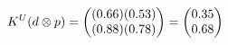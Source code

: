 \documentclass[preview]{standalone}
\begin{document}
\begin{align*}
\special{dvisvgm:raw <g id='unique000'>}K^U(d \otimes p) = \begin{pmatrix} (0.66)(0.53) \\ (0.88)(0.78) \end{pmatrix} = \begin{pmatrix} 0.35 \\ 0.68 \end{pmatrix}\special{dvisvgm:raw </g>}
\end{align*}
\end{document}
